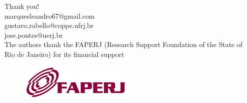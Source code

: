 \begin{frame}
 \centering
 \vspace{-1cm}
 \Huge Thank you!\\
 \vspace{0.5cm}
 \small marquesleandro67@gmail.com\\
 \small gustavo.rabello@coppe.ufrj.br\\
 \small jose.pontes@uerj.br\\
 \vspace{1.0cm}
 \small The authors thank the FAPERJ (Research Support Foundation of the State of Rio de Janeiro)
        for its financial support

 \vspace{-0.2cm}
 \begin{figure}
  \centering
  \includegraphics[scale=0.4]{images/faperj.jpg}\\
 \end{figure}
\end{frame}





